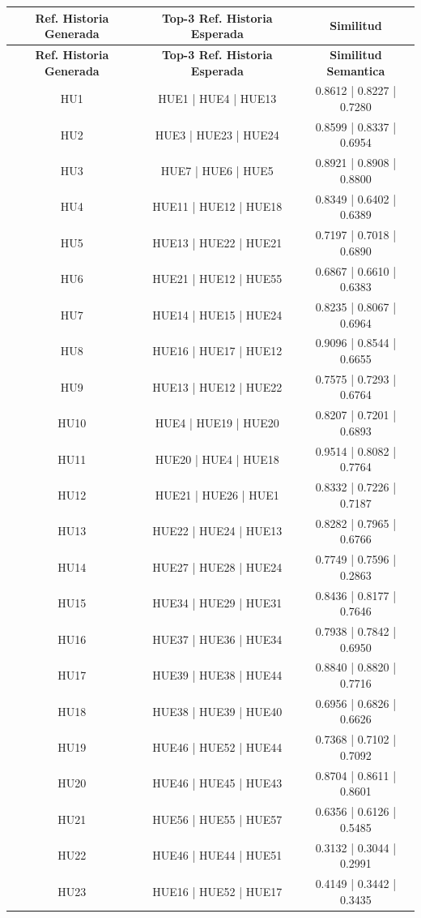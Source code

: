 \documentclass{prgrado}
\begin{document}

\begin{longtable}{|c|c|c|}
\hline
\textbf{Ref. Historia Generada} & \textbf{Top-3 Ref. Historia Esperada} & \textbf{Similitud} \\
\hline
\endfirsthead

\hline
\textbf{Ref. Historia Generada} & \textbf{Top-3 Ref. Historia Esperada} & \textbf{Similitud Semantica} \\
\hline
\endhead

HU1 & HUE1 | HUE4 | HUE13 & 0.8612 | 0.8227 | 0.7280 \\ \hline
HU2 & HUE3 | HUE23 | HUE24 & 0.8599 | 0.8337 | 0.6954 \\ \hline
HU3 & HUE7 | HUE6 | HUE5 & 0.8921 | 0.8908 | 0.8800 \\ \hline
HU4 & HUE11 | HUE12 | HUE18 & 0.8349 | 0.6402 | 0.6389 \\ \hline
HU5 & HUE13 | HUE22 | HUE21 & 0.7197 | 0.7018 | 0.6890 \\ \hline
HU6 & HUE21 | HUE12 | HUE55 & 0.6867 | 0.6610 | 0.6383 \\ \hline
HU7 & HUE14 | HUE15 | HUE24 & 0.8235 | 0.8067 | 0.6964 \\ \hline
HU8 & HUE16 | HUE17 | HUE12 & 0.9096 | 0.8544 | 0.6655 \\ \hline
HU9 & HUE13 | HUE12 | HUE22 & 0.7575 | 0.7293 | 0.6764 \\ \hline
HU10 & HUE4 | HUE19 | HUE20 & 0.8207 | 0.7201 | 0.6893 \\ \hline
HU11 & HUE20 | HUE4 | HUE18 & 0.9514 | 0.8082 | 0.7764 \\ \hline
HU12 & HUE21 | HUE26 | HUE1 & 0.8332 | 0.7226 | 0.7187 \\ \hline
HU13 & HUE22 | HUE24 | HUE13 & 0.8282 | 0.7965 | 0.6766 \\ \hline
HU14 & HUE27 | HUE28 | HUE24 & 0.7749 | 0.7596 | 0.2863 \\ \hline
HU15 & HUE34 | HUE29 | HUE31 & 0.8436 | 0.8177 | 0.7646 \\ \hline
HU16 & HUE37 | HUE36 | HUE34 & 0.7938 | 0.7842 | 0.6950 \\ \hline
HU17 & HUE39 | HUE38 | HUE44 & 0.8840 | 0.8820 | 0.7716 \\ \hline
HU18 & HUE38 | HUE39 | HUE40 & 0.6956 | 0.6826 | 0.6626 \\ \hline
HU19 & HUE46 | HUE52 | HUE44 & 0.7368 | 0.7102 | 0.7092 \\ \hline
HU20 & HUE46 | HUE45 | HUE43 & 0.8704 | 0.8611 | 0.8601 \\ \hline
HU21 & HUE56 | HUE55 | HUE57 & 0.6356 | 0.6126 | 0.5485 \\ \hline
HU22 & HUE46 | HUE44 | HUE51 & 0.3132 | 0.3044 | 0.2991 \\ \hline
HU23 & HUE16 | HUE52 | HUE17 & 0.4149 | 0.3442 | 0.3435 \\ \hline
\end{longtable}
\end{document}
